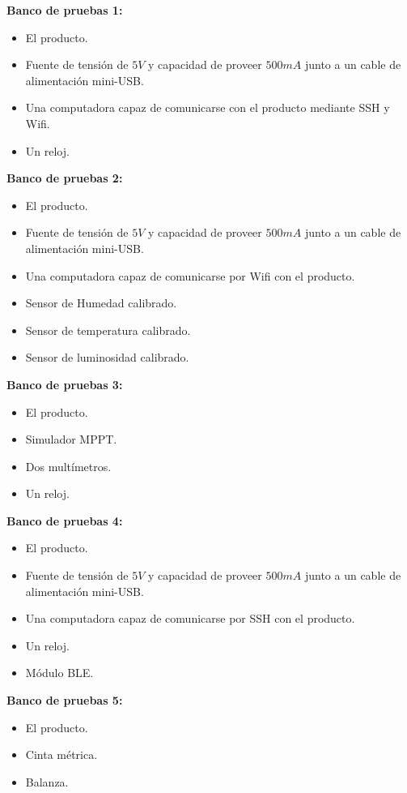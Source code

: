 \textbf{Banco de pruebas 1:}
\begin{itemize}
	\item El producto.	
	\item Fuente de tensión de $5V$ y capacidad de proveer $500mA$ junto a un cable de alimentación mini-USB.
	\item Una computadora capaz de comunicarse con el producto mediante SSH y Wifi.
	\item Un reloj.
\end{itemize}

\textbf{Banco de pruebas 2:}
\begin{itemize}
	\item El producto.	
	\item Fuente de tensión de $5V$ y capacidad de proveer $500mA$ junto a un cable de alimentación mini-USB.
	\item Una computadora capaz de comunicarse por Wifi con el producto.
	\item Sensor de Humedad calibrado.
	\item Sensor de temperatura calibrado.
	\item Sensor de luminosidad calibrado.
\end{itemize}

\textbf{Banco de pruebas 3:}
\begin{itemize}
	\item El producto.
	\item Simulador MPPT.
	\item Dos multímetros.
	\item Un reloj.
\end{itemize}

\textbf{Banco de pruebas 4:}
\begin{itemize}
	\item El producto.	
	\item Fuente de tensión de $5V$ y capacidad de proveer $500mA$ junto a un cable de alimentación mini-USB.
	\item Una computadora capaz de comunicarse por SSH con el producto.
	\item Un reloj.
	\item Módulo BLE.
\end{itemize}


\textbf{Banco de pruebas 5:}
\begin{itemize}
	\item El producto.
	\item Cinta métrica.
	\item Balanza.
\end{itemize}
